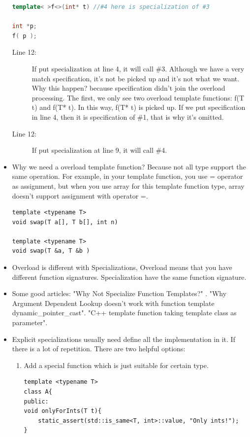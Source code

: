 \documentclass[a4paper,11pt,twoside]{book}
\begin{document}
\begin{itemize}
\begin{lstlisting}[frame=single, language=c++]
template< >f<>(int* t) //#4 here is specialization of #3

int *p; 
f( p ); 
\end{lstlisting}
\begin{description}
	\item[Line 12:] If put specialization at line 4, it will call \#3. Although we have a very match specification, it's not be picked up and it's not what we want.  Why this happen? because specification didn't join the overload processing. The first, we only see two overload template functions: f(T t) and f(T* t). In this way, f(T* t) is picked up. If we put specification in line 4, then it is specification of \#1, that is why it's omitted.

    \item [Line 12:] If put specialization at line 9, it will call \#4.
\end{description}

	\item Why we need a overload template function? Because not all type support the same operation. For example, in your template function, you use = operator as assignment, but when you use array for this template function type, array doesn't support assignment with operator =.
\begin{lstlisting}[numbers=none]
template <typename T>
void swap(T a[], T b[], int n)

template <typename T>
void swap(T &a, T &b )
\end{lstlisting}

\item Overload is different with Specializations, Overload means that you have different function signatures. Specialization have the same function signature.

\item Some good articles:\newline
"Why Not Specialize Function Templates?" .
\newline
"Why Argument Dependent Lookup doesn't work with function template dynamic\_pointer\_cast". 
\newline
"C++ template function taking template class as parameter".

	\item Explicit specializations usually need define all the implementation in it. If there is a lot of repetition. There are two helpful options: 
\begin{enumerate}
	\item Add a special function which is just suitable for certain type. 
\begin{lstlisting}[numbers=none]
template <typename T>
class A{
public:
void onlyForInts(T t){
	static_assert(std::is_same<T, int>::value, "Only ints!");
}


\end{lstlisting}
\end{enumerate}
\end{itemize}
\end{document}
